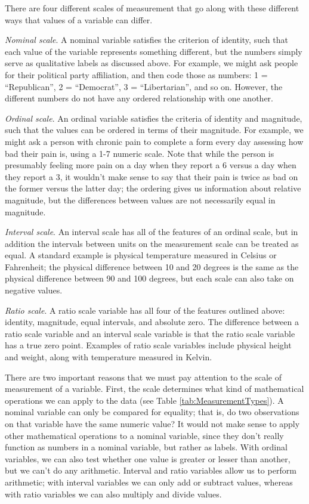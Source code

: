 \documentclass[
  12pt,
]{book}
\begin{document}
There are four different scales of measurement that go along with these different ways that values of a variable can differ.

\emph{Nominal scale}. A nominal variable satisfies the criterion of identity, such that each value of the variable represents something different, but the numbers simply serve as qualitative labels as discussed above. For example, we might ask people for their political party affiliation, and then code those as numbers: 1 = ``Republican'', 2 = ``Democrat'', 3 = ``Libertarian'', and so on. However, the different numbers do not have any ordered relationship with one another.

\emph{Ordinal scale}. An ordinal variable satisfies the criteria of identity and magnitude, such that the values can be ordered in terms of their magnitude. For example, we might ask a person with chronic pain to complete a form every day assessing how bad their pain is, using a 1-7 numeric scale. Note that while the person is presumably feeling more pain on a day when they report a 6 versus a day when they report a 3, it wouldn't make sense to say that their pain is twice as bad on the former versus the latter day; the ordering gives us information about relative magnitude, but the differences between values are not necessarily equal in magnitude.

\emph{Interval scale}. An interval scale has all of the features of an ordinal scale, but in addition the intervals between units on the measurement scale can be treated as equal. A standard example is physical temperature measured in Celsius or Fahrenheit; the physical difference between 10 and 20 degrees is the same as the physical difference between 90 and 100 degrees, but each scale can also take on negative values.

\emph{Ratio scale}. A ratio scale variable has all four of the features outlined above: identity, magnitude, equal intervals, and absolute zero. The difference between a ratio scale variable and an interval scale variable is that the ratio scale variable has a true zero point. Examples of ratio scale variables include physical height and weight, along with temperature measured in Kelvin.

There are two important reasons that we must pay attention to the scale of measurement of a variable. First, the scale determines what kind of mathematical operations we can apply to the data (see Table \ref{tab:MeasurementTypes}). A nominal variable can only be compared for equality; that is, do two observations on that variable have the same numeric value? It would not make sense to apply other mathematical operations to a nominal variable, since they don't really function as numbers in a nominal variable, but rather as labels. With ordinal variables, we can also test whether one value is greater or lesser than another, but we can't do any arithmetic. Interval and ratio variables allow us to perform arithmetic; with interval variables we can only add or subtract values, whereas with ratio variables we can also multiply and divide values.
\end{document}

